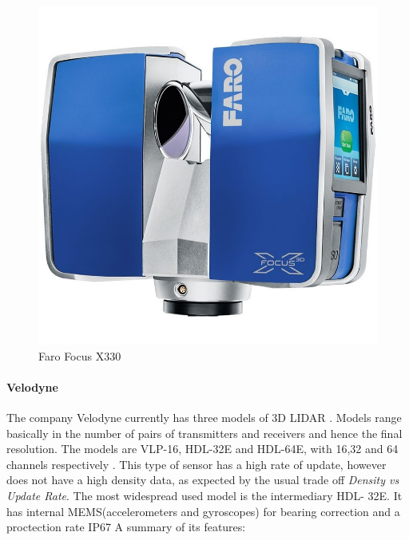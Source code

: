 % 
% 


\begin{figure}[h!]
	\includegraphics[width=0.6\columnwidth]{figs/3dsensors/faro}
	\caption{Faro Focus X330}
    \label{fig::faro_focus}
\end{figure}


\paragraph{Velodyne}

The company Velodyne currently has three models of 3D LIDAR . Models range
basically in the number of pairs of transmitters and receivers and hence the
final resolution. The models are VLP-16, HDL-32E  and HDL-64E, with 16,32 and 64
channels respectively . This type of sensor has a high rate of update, however
does not have a high density data, as expected by the usual trade off \textit{Density
vs Update Rate}.
The most widespread used model is the intermediary HDL- 32E. It has internal
MEMS\footnotemark[2](accelerometers and gyroscopes) for bearing correction and
a proctection rate IP67
A summary of its features:

